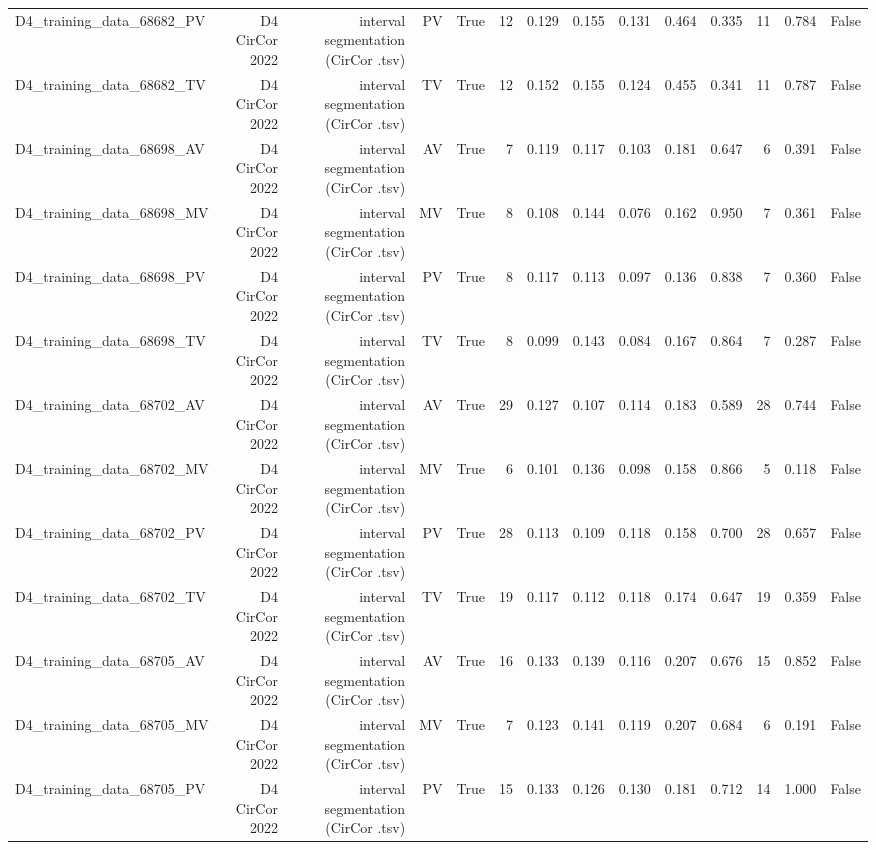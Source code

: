 \begin{table}[htbp]
\begin{tabular}{lrrrrrrrrrrrrr}
    D4\_training\_data\_68682\_PV & D4 CirCor 2022 & interval segmentation (CirCor .tsv) & PV & True & 12 & 0.129 & 0.155 & 0.131 & 0.464 & 0.335 & 11 & 0.784 & False \\
    D4\_training\_data\_68682\_TV & D4 CirCor 2022 & interval segmentation (CirCor .tsv) & TV & True & 12 & 0.152 & 0.155 & 0.124 & 0.455 & 0.341 & 11 & 0.787 & False \\
    D4\_training\_data\_68698\_AV & D4 CirCor 2022 & interval segmentation (CirCor .tsv) & AV & True & 7 & 0.119 & 0.117 & 0.103 & 0.181 & 0.647 & 6 & 0.391 & False \\
    D4\_training\_data\_68698\_MV & D4 CirCor 2022 & interval segmentation (CirCor .tsv) & MV & True & 8 & 0.108 & 0.144 & 0.076 & 0.162 & 0.950 & 7 & 0.361 & False \\
    D4\_training\_data\_68698\_PV & D4 CirCor 2022 & interval segmentation (CirCor .tsv) & PV & True & 8 & 0.117 & 0.113 & 0.097 & 0.136 & 0.838 & 7 & 0.360 & False \\
    D4\_training\_data\_68698\_TV & D4 CirCor 2022 & interval segmentation (CirCor .tsv) & TV & True & 8 & 0.099 & 0.143 & 0.084 & 0.167 & 0.864 & 7 & 0.287 & False \\
    D4\_training\_data\_68702\_AV & D4 CirCor 2022 & interval segmentation (CirCor .tsv) & AV & True & 29 & 0.127 & 0.107 & 0.114 & 0.183 & 0.589 & 28 & 0.744 & False \\
    D4\_training\_data\_68702\_MV & D4 CirCor 2022 & interval segmentation (CirCor .tsv) & MV & True & 6 & 0.101 & 0.136 & 0.098 & 0.158 & 0.866 & 5 & 0.118 & False \\
    D4\_training\_data\_68702\_PV & D4 CirCor 2022 & interval segmentation (CirCor .tsv) & PV & True & 28 & 0.113 & 0.109 & 0.118 & 0.158 & 0.700 & 28 & 0.657 & False \\
    D4\_training\_data\_68702\_TV & D4 CirCor 2022 & interval segmentation (CirCor .tsv) & TV & True & 19 & 0.117 & 0.112 & 0.118 & 0.174 & 0.647 & 19 & 0.359 & False \\
    D4\_training\_data\_68705\_AV & D4 CirCor 2022 & interval segmentation (CirCor .tsv) & AV & True & 16 & 0.133 & 0.139 & 0.116 & 0.207 & 0.676 & 15 & 0.852 & False \\
    D4\_training\_data\_68705\_MV & D4 CirCor 2022 & interval segmentation (CirCor .tsv) & MV & True & 7 & 0.123 & 0.141 & 0.119 & 0.207 & 0.684 & 6 & 0.191 & False \\
    D4\_training\_data\_68705\_PV & D4 CirCor 2022 & interval segmentation (CirCor .tsv) & PV & True & 15 & 0.133 & 0.126 & 0.130 & 0.181 & 0.712 & 14 & 1.000 & False \\

\end{tabular}
\end{table}
